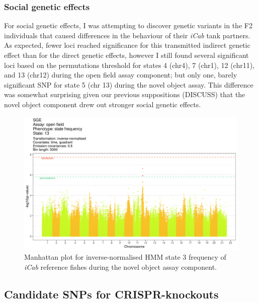 \documentclass[
]{book}
\begin{document}
\hypertarget{social-genetic-effects-3}{%
\subsubsection{Social genetic effects}\label{social-genetic-effects-3}}

For social genetic effects, I was attempting to discover genetic variants in the F2 individuals that caused differences in the behaviour of their \emph{\textcolor{iCab_424B4D}{iCab}} tank partners. As expected, fewer loci reached significance for this transmitted indirect genetic effect than for the direct genetic effects, however I still found several significant loci based on the permutations threshold for states 4 (chr4), 7 (chr1), 12 (chr11), and 13 (chr12) during the open field assay component; but only one, barely significant SNP for state 5 (chr 13) during the novel object assay. This difference was somewhat surprising given our previous suppositions (DISCUSS) that the novel object component drew out stronger social genetic effects.



\begin{figure}
\includegraphics[width=1\linewidth]{figs/mikk_behaviour/manhattans/sge_of_13_time-quadrant} \caption{Manhattan plot for inverse-normalised HMM state 3 frequency of \emph{\textcolor{iCab_424B4D}{iCab}} reference fishes during the novel object assay component.}\label{fig:F2-man-sge-of-13}
\end{figure}

\hypertarget{candidate-snps-for-crispr-knockouts}{%
\subsection{Candidate SNPs for CRISPR-knockouts}\label{candidate-snps-for-crispr-knockouts}}
\end{document}
